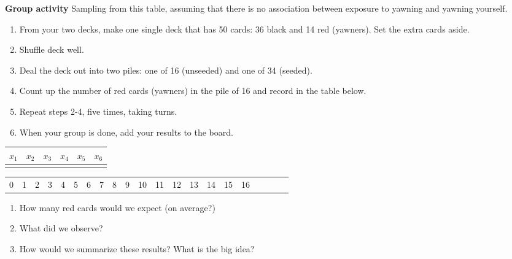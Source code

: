 \documentclass[10pt]{article}\usepackage[]{graphicx}\usepackage[]{color}
\newcommand{\ans}{\vspace{0.25in}}
\begin{document}
\newpage

\textbf{Group activity} Sampling from this table, assuming that there is no association between exposure to yawning and yawning yourself.  
\begin{enumerate}
  \item From your two decks, make one single deck that has 50 cards: 36 black and 14 red (yawners).  Set the extra cards aside.
  \item Shuffle deck well.
  \item Deal the deck out into two piles: one of 16 (unseeded) and one of 34 (seeded).
  \item Count up the number of red cards (yawners) in the pile of 16 and record in the table below.
  \item Repeat steps 2-4, five times, taking turns.
  \item When your group is done, add your results to the board.
\end{enumerate}

\begin{center}
\begin{tabular}{|c|c|c|c|c|c|}
  \hline
  $x_1$ & $x_2$ & $x_3$ & $x_4$ & $x_5$ & $x_6$ \\
  \hline
  \hspace{0.75in} & \hspace{0.75in} & \hspace{0.75in} & \hspace{0.75in} & \hspace{0.75in} & \hspace{0.75in} \\[5ex]
  \hline
\end{tabular}
\end{center}

\vspace{2in}

\begin{center}
\begin{tabular}{|c|c|c|c|c|c|c|c|c|c|c|c|c|c|c|c|c|c|c|c|c|}
  \hline
  0 & 1 & 2 & 3 & 4 & 5 & 6 & 7 & 8 & 9 & 10 & 11 & 12 & 13 & 14 & 15 & 16 \\
\end{tabular}
\end{center}

\vspace{15mm}

\begin{enumerate}
  \item How many red cards would we expect (on average?)
  \ans
  \item What did we observe?
  \ans
  \item How would we summarize these results?   What is the big idea?
  \ans
\end{enumerate}
\end{document}
